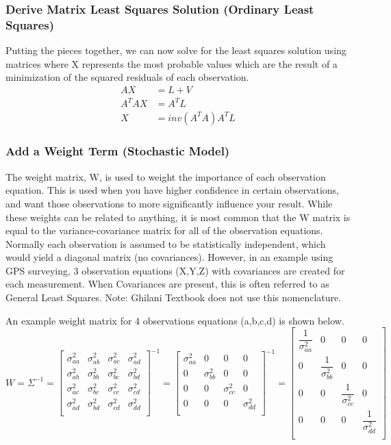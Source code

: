 \subsubsection*{Derive Matrix Least Squares Solution (Ordinary Least Squares)}
Putting the pieces together, we can now solve for the least squares solution using matrices where X represents the most probable values which are the result of a minimization of the squared residuals of each observation.
\begin{align*}
AX &= L + V \\
A^TAX &= A^TL \\
X &= inv(A^TA)A^TL
\end{align*}
\subsubsection*{Add a Weight Term (Stochastic Model)}
The weight matrix, W, is used to weight the importance of each observation equation.  This is used when you have higher confidence in certain observations, and want those observations to more significantly influence your result.  While these weights can be related to anything, it is most common that the W matrix is equal to the variance-covariance matrix for all of the observation equations.  Normally each observation is assumed to be statistically independent, which would yield a diagonal matrix (no covariances).  However, in an example using GPS surveying, 3 observation equations (X,Y,Z) with covariances are created for each measurement.  When Covariances are present, this is often referred to as General Least Squares.  Note: Ghilani Textbook does not use this nomenclature.

An example weight matrix for 4 observations equations (a,b,c,d) is shown below.
\[
W = \Sigma^{-1} = 
\begin{bmatrix}
\sigma_{aa}^2 & \sigma_{ab}^2 & \sigma_{ac}^2 & \sigma_{ad}^2 \\ 
\sigma_{ab}^2 & \sigma_{bb}^2 & \sigma_{bc}^2 & \sigma_{bd}^2 \\ 
\sigma_{ac}^2 & \sigma_{bc}^2 & \sigma_{cc}^2 & \sigma_{cd}^2 \\ 
\sigma_{ad}^2 & \sigma_{bd}^2 & \sigma_{cd}^2 & \sigma_{dd}^2 \\ 

\end{bmatrix}
^{-1}
= 
\begin{bmatrix}
\sigma_{aa}^2 & 0 & 0 & 0 \\ 
0 & \sigma_{bb}^2 & 0 & 0 \\
0 & 0 & \sigma_{cc}^2 & 0 \\
0 & 0 & 0 & \sigma_{dd}^2 \\
\end{bmatrix}
^{-1}
=
\begin{bmatrix}
\dfrac{1}{\sigma_{aa}^2} & 0 & 0 & 0 \\ 
0 & \dfrac{1}{\sigma_{bb}^2} & 0 & 0 \\
0 & 0 & \dfrac{1}{\sigma_{cc}^2} & 0 \\
0 & 0 & 0 & \dfrac{1}{\sigma_{dd}^2} \\
\end{bmatrix}
\]

